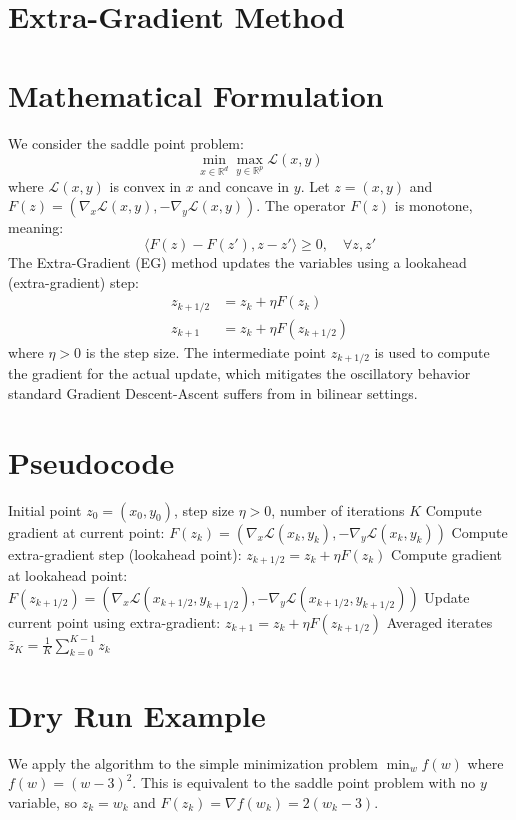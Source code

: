 \documentclass{article}
\begin{document}
\section*{Extra-Gradient Method}

\section*{Mathematical Formulation}
We consider the saddle point problem:
$$ \min_{x \in \mathbb{R}^d} \max_{y \in \mathbb{R}^p} \mathcal{L}(x, y) $$
where $\mathcal{L}(x, y)$ is convex in $x$ and concave in $y$. Let $z = (x, y)$ and $F(z) = (\nabla_x \mathcal{L}(x, y), -\nabla_y \mathcal{L}(x, y))$. The operator $F(z)$ is monotone, meaning:
$$ \langle F(z) - F(z'), z - z' \rangle \geq 0, \quad \forall z, z' $$
The Extra-Gradient (EG) method updates the variables using a lookahead (extra-gradient) step:
\begin{align*}
    z_{k+1/2} &= z_k + \eta F(z_k) \\
    z_{k+1} &= z_k + \eta F(z_{k+1/2})
\end{align*}
where $\eta > 0$ is the step size. The intermediate point $z_{k+1/2}$ is used to compute the gradient for the actual update, which mitigates the oscillatory behavior standard Gradient Descent-Ascent suffers from in bilinear settings.

\section*{Pseudocode}
\begin{algorithm}[H]
\caption{Extra-Gradient Method for Saddle Point Problems}
\begin{algorithmic}[1]
\REQUIRE Initial point $z_0 = (x_0, y_0)$, step size $\eta > 0$, number of iterations $K$
    \STATE Compute gradient at current point: $F(z_k) = (\nabla_x \mathcal{L}(x_k, y_k), -\nabla_y \mathcal{L}(x_k, y_k))$
    \STATE Compute extra-gradient step (lookahead point):
    $z_{k+1/2} = z_k + \eta F(z_k)$
    \STATE Compute gradient at lookahead point: $F(z_{k+1/2}) = (\nabla_x \mathcal{L}(x_{k+1/2}, y_{k+1/2}), -\nabla_y \mathcal{L}(x_{k+1/2}, y_{k+1/2}))$
    \STATE Update current point using extra-gradient:
    $z_{k+1} = z_k + \eta F(z_{k+1/2})$
\ENDFOR
\RETURN Averaged iterates $\bar{z}_K = \frac{1}{K} \sum_{k=0}^{K-1} z_k$
\end{algorithmic}
\end{algorithm}

\section*{Dry Run Example}
We apply the algorithm to the simple minimization problem $\min_w f(w)$ where $f(w) = (w-3)^2$. This is equivalent to the saddle point problem with no $y$ variable, so $z_k = w_k$ and $F(z_k) = \nabla f(w_k) = 2(w_k - 3)$.
\end{document}
